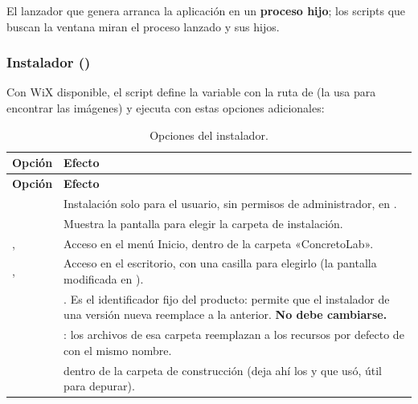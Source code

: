 El lanzador  que genera  arranca la aplicación en un \textbf{proceso hijo}; los
scripts que buscan la ventana miran el proceso lanzado y sus hijos.

\subsubsection{Instalador ()}

Con WiX disponible, el script define la variable  con la ruta de
 (la usa  para encontrar las imágenes) y ejecuta
 con estas opciones adicionales:

\begin{longtable}{L{4.6cm}L{10.2cm}}
	\caption{Opciones del instalador.} \label{tab:dis-jpackage-exe} \\
	\hline
	\textbf{Opción} & \textbf{Efecto} \\ \hline
	\endfirsthead
	\hline
	\textbf{Opción} & \textbf{Efecto} \\ \hline
	\endhead
	\hline
	\endfoot
	 & Instalación solo para el usuario, sin permisos de administrador, en
	. \\
	 & Muestra la pantalla para elegir la carpeta de instalación. \\
	,  & Acceso en el menú Inicio, dentro de la carpeta
	«ConcretoLab». \\
	,  & Acceso en el escritorio, con una casilla para elegirlo
	(la pantalla modificada en ). \\
	 & . Es el identificador fijo del producto:
	permite que el instalador de una versión nueva reemplace a la anterior. \textbf{No debe cambiarse.} \\
	 & : los archivos de esa carpeta
	reemplazan a los recursos por defecto de  con el mismo nombre. \\
	 &  dentro de la carpeta de construcción (deja ahí los  y
	 que usó, útil para depurar). \\
\end{longtable}

